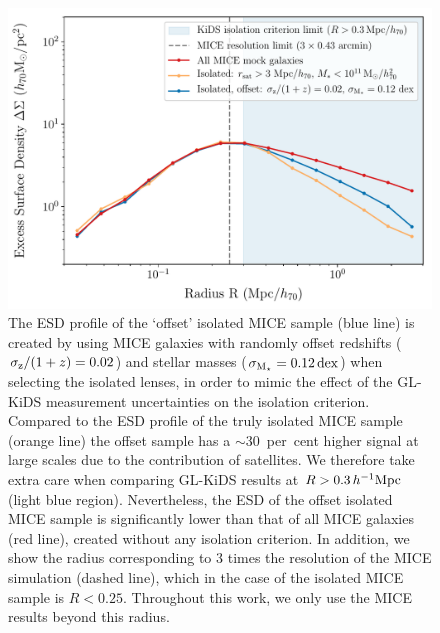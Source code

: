 \documentclass[usenatbib]{mnras}
\newcommand{\hMpc}{\, h^{-1}{\rm{Mpc}} }
\newcommand{\un}[1]{_{\rm #1}}
\newcommand{\dex}{\, {\rm dex}}
\begin{document}
\begin{figure}
	\includegraphics[width=1.0\columnwidth]{Figures/ESD_MICE_isotest_offset.pdf}
	\caption{The ESD profile of the `offset' isolated MICE sample (blue line) is created by using MICE galaxies with randomly offset redshifts ($\sigma\un{z}/(1+z) = 0.02$) and stellar masses ($\sigma\un{M_\star} = 0.12 \dex$) when selecting the isolated lenses, in order to mimic the effect of the GL-KiDS measurement uncertainties on the isolation criterion. Compared to the ESD profile of the truly isolated MICE sample (orange line) the offset sample has a $\sim30$~per~cent higher signal at large scales due to the contribution of satellites. We therefore take extra care when comparing GL-KiDS results at $R > 0.3 \hMpc$ (light blue region). Nevertheless, the ESD of the offset isolated MICE sample is significantly lower than that of all MICE galaxies (red line), created without any isolation criterion. In addition, we show the radius corresponding to 3 times the resolution of the MICE simulation (dashed line), which in the case of the isolated MICE sample is $R<0.25$. Throughout this work, we only use the MICE results beyond this radius.}
	\label{fig:isolation_test_offset}
\end{figure}
\end{document}
